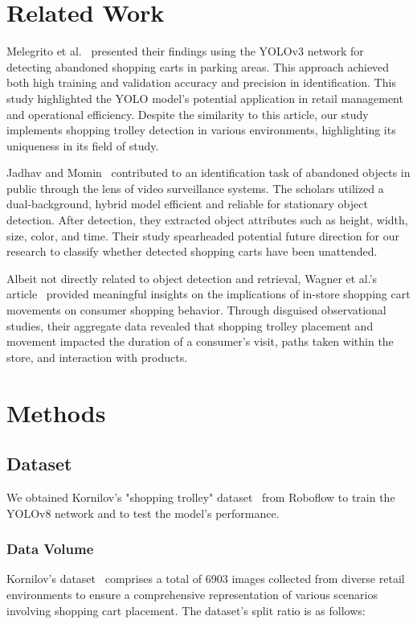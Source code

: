 \documentclass[10pt,twocolumn,letterpaper]{article}
\begin{document}
\section{Related Work}
Melegrito et al.~\cite{abandoned-cart} presented their findings using the YOLOv3 network for detecting abandoned shopping carts in parking areas. This approach achieved both high training and validation accuracy and precision in identification. This study highlighted the YOLO model's potential application in retail management and operational efficiency. Despite the similarity to this article, our study implements shopping trolley detection in various environments, highlighting its uniqueness in its field of study.

Jadhav and Momin~\cite{detection-identifcation} contributed to an identification task of abandoned objects in public through the lens of video surveillance systems. The scholars utilized a dual-background, hybrid model efficient and reliable for stationary object detection. After detection, they extracted object attributes such as height, width, size, color, and time. Their study spearheaded potential future direction for our research to classify whether detected shopping carts have been unattended.

Albeit not directly related to object detection and retrieval, Wagner et al.'s article~\cite{wagner} provided meaningful insights on the implications of in-store shopping cart movements on consumer shopping behavior. Through disguised observational studies, their aggregate data revealed that shopping trolley placement and movement impacted the duration of a consumer's visit, paths taken within the store, and interaction with products.

\section{Methods}

\subsection{Dataset}
We obtained Kornilov's "shopping trolley" dataset~\cite{kornilov-dataset} from Roboflow to train the YOLOv8 network and to test the model's performance.

\subsubsection{Data Volume}
Kornilov's dataset~\cite{kornilov-dataset} comprises a total of 6903 images collected from diverse retail environments to ensure a comprehensive representation of various scenarios involving shopping cart placement. The dataset's split ratio is as follows:
\end{document}
